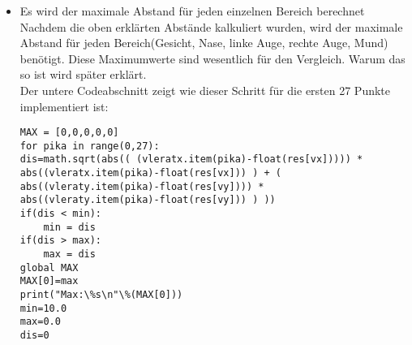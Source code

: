 \begin{enumerate}
\begin{itemize}
	
	\begin{figure}[H]
		\centering
		\texttt{[image: \\ordnerfigures Vergleichsweg.png]}
		\caption{Vergleichsmethode zweier Punkte}
		\label{fig:Vergleichsweg}
	\end{figure}
	
	Auf Abbildung \ref{fig:Vergleichsweg} wird die verwendete Vergleichsmethode dargestellt. Der Startpunkt hat die Koordinaten (0/0) und befindet sich links oben. Jeder Punkt hat seine bestimmten Koordinaten, zum Beispiel, der Punkt 36 des ersten Bildes hat die Koordinaten x1 und y1, und den 36.Punkt des anderen Bildes hat die Koordinaten x2 und y2. Um den Abstand des Punkt 36 zu berechnen, wird die pythagoreische Formel verwendet. Die Differenz der x-Koordinaten und die Differenz der beiden y-Koordinaten sind die beide Katheten(a und b auf der Abbildung). Um die Hypotenuse zu finden wird das Quadrat beider Katheten addiert, und am Ende wird die Wurzel des Ergebnisses berechnet. Das Ergebnis ist der Abstand des Punktes 36 vom Startpunkt. Dieselbe Methode wird für jeder Punkt verwendet.
	Das obige Beispiel vergleicht die Abstände der Punkte von 2 verschiedenen Bildern. Das Vergleichsprinzip ist dasselbe wie bei dem Vergleich der Punkteabstände des gemachten Bildes und der in der Datenbank gespeicherten Punkteabstände. Es ist einfach leichter erklärbar und verstehbar, wenn 2 Bildern vergleicht wurden. 
	Die Abstände aller Punkt aller Bereiche wurde in einer Variable gespeichert.\\
	
	\item Es wird der maximale Abstand für jeden einzelnen Bereich berechnet \\
	
	Nachdem die oben erklärten Abstände kalkuliert wurden, wird der maximale Abstand für jeden Bereich(Gesicht, Nase, linke Auge, rechte Auge, Mund) benötigt. Diese Maximumwerte sind wesentlich für den Vergleich. Warum das so ist wird später erklärt. \\
	Der untere Codeabschnitt zeigt wie dieser Schritt für die ersten 27 Punkte implementiert ist: \\
	
\begin{lstlisting}
MAX = [0,0,0,0,0]
for pika in range(0,27):
dis=math.sqrt(abs(( (vleratx.item(pika)-float(res[vx])))) * 
abs((vleratx.item(pika)-float(res[vx])) ) + ( 
abs((vleraty.item(pika)-float(res[vy]))) * 
abs((vleraty.item(pika)-float(res[vy])) ) ))
if(dis < min):
	min = dis
if(dis > max):
	max = dis    
global MAX
MAX[0]=max
print("Max:\%s\n"\%(MAX[0]))
min=10.0
max=0.0
dis=0
\end{lstlisting}
	

\end{itemize}
\end{enumerate}
